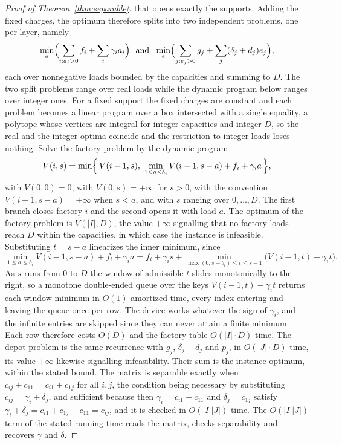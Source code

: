 \begin{proof}[Proof of Theorem~\ref{thm:separable}]
that opens exactly the supports. Adding the fixed charges, the optimum
therefore
splits into two independent problems, one per layer, namely
\[
\min_{a}\Bigl(\sum_{i:a_i>0}f_i+\sum_i\gamma_i a_i\Bigr)
\ \text{ and }\
\min_{e}\Bigl(\sum_{j:e_j>0}g_j+\sum_j(\delta_j+d_j)e_j\Bigr),
\]
each over nonnegative loads bounded by the capacities and summing to $D$.
The two split problems range over real loads while the dynamic program
below ranges over integer ones. For a fixed support the fixed charges
are constant and each problem becomes a linear program over a box
intersected with a single equality, a polytope whose vertices are
integral for integer capacities and integer $D$, so the real and the
integer optima coincide and the restriction to integer loads loses
nothing.
Solve the factory problem by the dynamic program
\[
V(i,s)=\min\Bigl\{\,V(i-1,s),\ \min_{1\le a\le b_i}V(i-1,s-a)+f_i+\gamma_i
a\,\Bigr\},
\]
with $V(0,0)=0$, with $V(0,s)=+\infty$ for $s>0$, with the convention
$V(i-1,s-a)=+\infty$ when $s<a$, and with $s$ ranging over
$0,\dots,D$. The first branch closes factory $i$ and the second opens it
with load $a$. The optimum of the factory problem is $V(|I|,D)$, the
value $+\infty$ signalling that no factory loads reach $D$ within the
capacities, in which case the instance is infeasible. Substituting
$t=s-a$ linearizes the inner minimum, since
\[
\min_{1\le a\le b_i}V(i-1,s-a)+f_i+\gamma_i a
= f_i+\gamma_i s+\min_{\max(0,s-b_i)\le t\le s-1}
\bigl(V(i-1,t)-\gamma_i t\bigr).
\]
As $s$ runs from $0$ to $D$ the window of admissible $t$ slides
monotonically to the right, so a monotone double-ended queue over the
keys $V(i-1,t)-\gamma_i t$ returns each window minimum in $O(1)$
amortized time, every index entering and leaving the queue once per
row. The device works whatever the sign of $\gamma_i$, and the
infinite entries are skipped since they can never attain a finite
minimum. Each row therefore
costs $O(D)$ and the factory table $O(|I|\cdot D)$ time. The depot
problem is the
same recurrence with $g_j$, $\delta_j+d_j$ and $p_j$, in $O(|J|\cdot
D)$ time, its value $+\infty$ likewise signalling
infeasibility. Their sum is the instance optimum, within the
stated bound. The matrix is separable exactly when
$c_{ij}+c_{11}=c_{i1}+c_{1j}$ for all $i,j$, the condition being necessary by
substituting $c_{ij}=\gamma_i+\delta_j$, and sufficient because then
$\gamma_i=c_{i1}-c_{11}$ and $\delta_j=c_{1j}$ satisfy
$\gamma_i+\delta_j=c_{i1}+c_{1j}-c_{11}=c_{ij}$, and it is checked in
$O(|I||J|)$ time. The $O(|I||J|)$ term of the stated running time reads
the matrix, checks separability and recovers $\gamma$ and $\delta$.
\end{proof}

